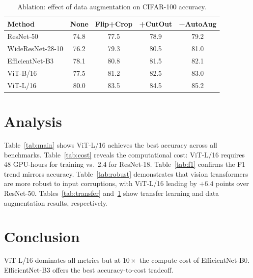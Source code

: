 \documentclass{article}
\begin{document}
\begin{table}[h]
\caption{Ablation: effect of data augmentation on CIFAR-100 accuracy.}
\label{tab:ablation}
\centering
\begin{tabular}{lcccc}
\toprule
\textbf{Method} & \textbf{None} & \textbf{Flip+Crop} & \textbf{+CutOut} & \textbf{+AutoAug} \\
\midrule
ResNet-50       & 74.8 & 77.5 & 78.9 & 79.2 \\
WideResNet-28-10 & 76.2 & 79.3 & 80.5 & 81.0 \\
EfficientNet-B3 & 78.1 & 80.8 & 81.5 & 82.1 \\
ViT-B/16        & 77.5 & 81.2 & 82.5 & 83.0 \\
ViT-L/16        & 80.0 & 83.5 & 84.5 & 85.2 \\
\bottomrule
\end{tabular}
\end{table}

\section{Analysis}

Table~\ref{tab:main} shows ViT-L/16 achieves the best accuracy across all benchmarks.
Table~\ref{tab:cost} reveals the computational cost: ViT-L/16 requires
48 GPU-hours for training vs.\ 2.4 for ResNet-18.
Table~\ref{tab:f1} confirms the F1 trend mirrors accuracy.
Table~\ref{tab:robust} demonstrates that vision transformers are more robust
to input corruptions, with ViT-L/16 leading by $+6.4$ points over ResNet-50.
Tables~\ref{tab:transfer} and~\ref{tab:ablation} show transfer learning and
data augmentation results, respectively.

\section{Conclusion}

ViT-L/16 dominates all metrics but at $10\times$ the compute cost of EfficientNet-B0.
EfficientNet-B3 offers the best accuracy-to-cost tradeoff.
\end{document}

